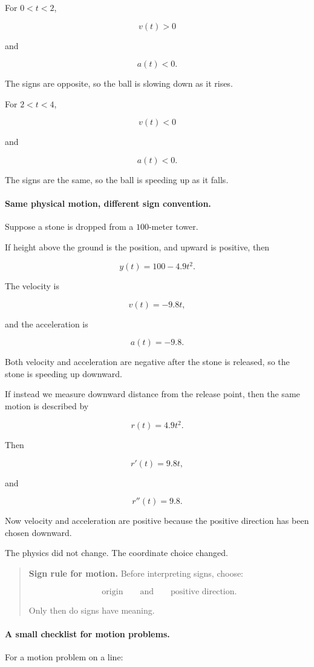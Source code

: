For \(0<t<2\),

\[
v(t)>0
\]

and

\[
a(t)<0.
\]

The signs are opposite, so the ball is slowing down as it rises.

For \(2<t<4\),

\[
v(t)<0
\]

and

\[
a(t)<0.
\]

The signs are the same, so the ball is speeding up as it falls.

\paragraph{Same physical motion, different sign convention.}
Suppose a stone is dropped from a \(100\)-meter tower.

If height above the ground is the position, and upward is positive, then

\[
y(t)=100-4.9t^2.
\]

The velocity is

\[
v(t)=-9.8t,
\]

and the acceleration is

\[
a(t)=-9.8.
\]

Both velocity and acceleration are negative after the stone is released, so the stone is speeding up downward.

If instead we measure downward distance from the release point, then the same motion is described by

\[
r(t)=4.9t^2.
\]

Then

\[
r'(t)=9.8t,
\]

and

\[
r''(t)=9.8.
\]

Now velocity and acceleration are positive because the positive direction has been chosen downward.

The physics did not change.  The coordinate choice changed.

\begin{quote}
\textbf{Sign rule for motion.}
Before interpreting signs, choose:

\[
\text{origin}
\qquad\text{and}\qquad
\text{positive direction}.
\]

Only then do signs have meaning.
\end{quote}

\paragraph{A small checklist for motion problems.}
For a motion problem on a line:

